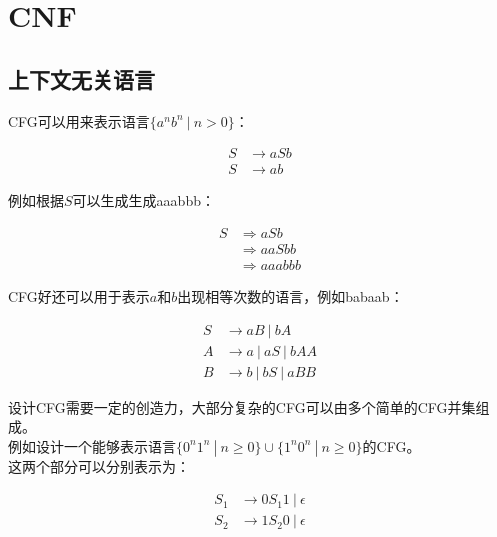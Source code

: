 \newpage

\section{CNF}

\subsection{上下文无关语言}

CFG可以用来表示语言$ \{a^nb^n\ |\ n > 0\} $：

\vspace{-1cm}

\begin{align*}
    S & \rightarrow aSb \\
    S & \rightarrow ab
\end{align*}

例如根据$ S $可以生成生成aaabbb：

\vspace{-1cm}

\begin{align*}
    S & \Rightarrow aSb    \\
      & \Rightarrow aaSbb  \\
      & \Rightarrow aaabbb
\end{align*}

CFG好还可以用于表示$ a $和$ b $出现相等次数的语言，例如babaab：

\vspace{-1cm}

\begin{align*}
    S & \rightarrow aB\ |\ bA        \\
    A & \rightarrow a\ |\ aS\ |\ bAA \\
    B & \rightarrow b\ |\ bS\ |\ aBB
\end{align*}

设计CFG需要一定的创造力，大部分复杂的CFG可以由多个简单的CFG并集组成。\\

例如设计一个能够表示语言$ \{0^n1^n\ |\ n \ge 0\} \cup \{1^n0^n\ |\ n \ge 0\} $的CFG。\\

这两个部分可以分别表示为：

\vspace{-1cm}

\begin{align*}
    S_1 & \rightarrow 0S_{1}1\ |\ \epsilon \\
    S_2 & \rightarrow 1S_{2}0\ |\ \epsilon
\end{align*}

